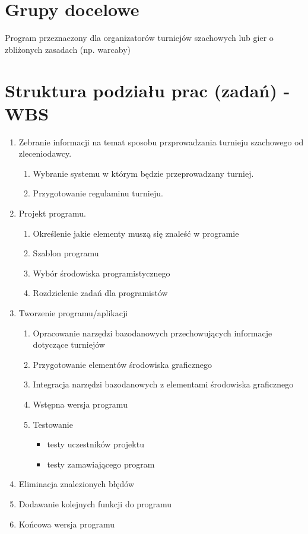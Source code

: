 \section{Grupy docelowe}
Program przeznaczony dla organizatorów turniejów szachowych lub gier o zbliżonych zasadach (np. warcaby)  


\section{Struktura podziału prac (zadań) - WBS}
\begin{enumerate}
\item Zebranie informacji na temat sposobu przprowadzania turnieju szachowego od zleceniodawcy.
\begin{enumerate}
	\item Wybranie systemu w którym będzie przeprowadzany turniej.
	\item Przygotowanie regulaminu turnieju.
\end{enumerate}
\item Projekt programu.
\begin{enumerate}
\item Określenie jakie elementy muszą się znaleść w programie
\item Szablon programu
\item Wybór środowiska programistycznego
\item Rozdzielenie zadań dla programistów
\end{enumerate}
\item Tworzenie programu/aplikacji
\begin{enumerate}
\item Opracowanie narzędzi bazodanowych przechowujących informacje dotyczące turniejów
\item Przygotowanie elementów środowiska graficznego
\item Integracja narzędzi bazodanowych z elementami środowiska graficznego
\item Wstępna wersja programu
\item Testowanie
\begin{itemize}
\item testy uczestników projektu
\item testy zamawiającego program
\end{itemize}

\end{enumerate}
\item Eliminacja znalezionych błędów
\item Dodawanie kolejnych funkcji do programu
\item Końcowa wersja programu

\end{enumerate}

